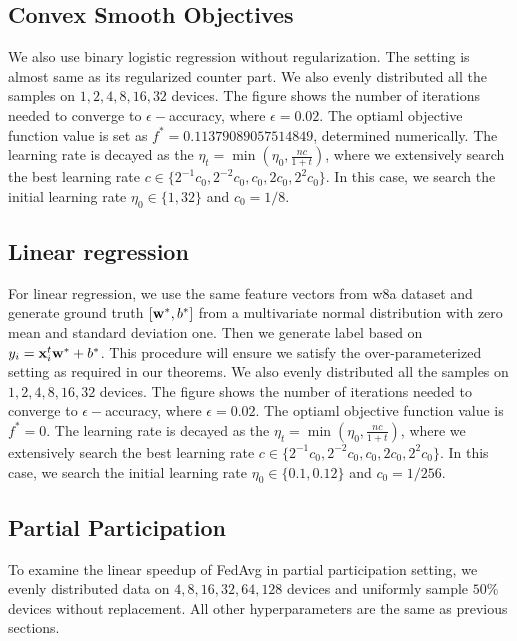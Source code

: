 \subsection{Convex Smooth Objectives}
We also use binary logistic regression without regularization.
The setting is almost same as its regularized counter part. We also evenly distributed all the samples on $1, 2, 4, 8, 16, 32$ devices. The figure shows the number of iterations needed to converge to $\epsilon-$accuracy, where $\epsilon=0.02$. The optiaml objective function value is set as $f^*=0.11379089057514849$, determined numerically. 
The learning rate is decayed as the $\eta_t = \min(\eta_0, \frac{nc}{1 + t})$, where we extensively search the best learning rate $c \in \{2^{-1}c_0, 2^{-2}c_0, c_0, 2c_0, 2^{2}c_0\}$. In this case, we search the initial learning rate $\eta_0\in \{1, 32\}$ and $c_0 = 1/8$.


\subsection{Linear regression}
For linear regression, we use the same feature vectors from w8a dataset 
and generate ground truth $[{\mathbf{w}}^*, b^*]$ from a multivariate normal distribution
with zero mean and standard deviation one. Then we generate label 
based on $y_i = {\mathbf{x}}_i^t{\mathbf{w}}^* + b^*$. This procedure will ensure we satisfy
the over-parameterized setting as required in our theorems. 
We also evenly distributed all the samples on $1, 2, 4, 8, 16, 32$ devices. The figure shows the number of iterations needed to converge to $\epsilon-$accuracy, where $\epsilon=0.02$. The optiaml objective function value is $f^*=0$. 
The learning rate is decayed as the $\eta_t = \min(\eta_0, \frac{nc}{1 + t})$, where we extensively search the best learning rate $c \in \{2^{-1}c_0, 2^{-2}c_0, c_0, 2c_0, 2^{2}c_0\}$. In this case, we search the initial learning rate $\eta_0\in \{0.1, 0.12\}$ and $c_0 = 1/256$.

\subsection{Partial Participation}
To examine the linear speedup of FedAvg in partial participation setting,
we evenly distributed data on $4, 8, 16, 32, 64, 128$ devices and 
uniformly sample $50\%$ devices without replacement. 
All other hyperparameters are the same as previous sections. 

